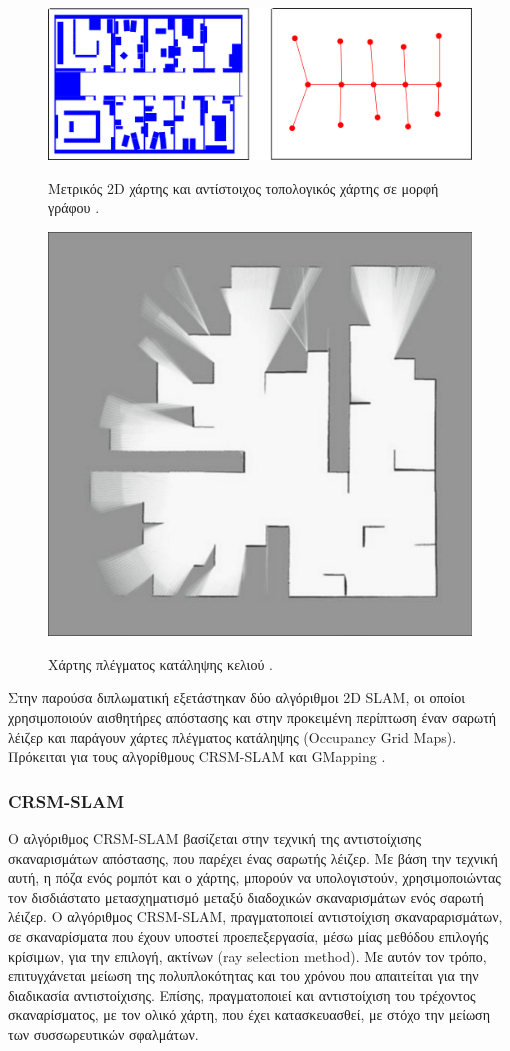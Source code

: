 \begin{figure}[!ht]
	\centering
	\includegraphics[width=0.7\linewidth]{Chapters/Chapter3/Figures/ogm_and_tm.png}
	\label{fig:ogm_and_tm}
	\caption[Μετρικός 2D χάρτης και αντίστοιχος τοπολογικός χάρτης σε μορφή γράφου.]{Μετρικός 2D χάρτης και αντίστοιχος τοπολογικός χάρτης σε μορφή γράφου \cite{probabilistic_robotics}.}
\end{figure}

\begin{figure}[!ht]
	\centering
	\includegraphics[width=0.4\linewidth]{Chapters/Chapter3/Figures/ogm.jpg}
	\label{fig:ogm}
	\caption[Χάρτης πλέγματος κατάληψης κελιού.]{Χάρτης πλέγματος κατάληψης κελιού \cite{crsm}.}
\end{figure}

\bigskip
Στην παρούσα διπλωματική εξετάστηκαν δύο αλγόριθμοι 2D SLAM, οι οποίοι χρησιμοποιούν αισθητήρες απόστασης και στην προκειμένη περίπτωση έναν {σαρωτή λέιζερ} και παράγουν χάρτες πλέγματος κατάληψης (Occupancy Grid Maps). Πρόκειται για τους αλγορίθμους CRSM-SLAM \cite{crsm} και GMapping \cite{gmapping}.

\bigskip
\subsubsection{CRSM-SLAM} \label{sssec:crsm_slam}
Ο αλγόριθμος CRSM-SLAM βασίζεται στην τεχνική της αντιστοίχισης σκαναρισμάτων απόστασης, που παρέχει ένας {σαρωτής λέιζερ}. Με βάση την τεχνική αυτή, η πόζα ενός ρομπότ και ο χάρτης, μπορούν να υπολογιστούν, χρησιμοποιώντας τον δισδιάστατο μετασχηματισμό μεταξύ διαδοχικών σκαναρισμάτων ενός σαρωτή λέιζερ. Ο αλγόριθμος CRSM-SLAM, πραγματοποιεί αντιστοίχιση σκαναραρισμάτων, σε σκαναρίσματα που έχουν υποστεί προεπεξεργασία, μέσω μίας μεθόδου επιλογής κρίσιμων, για την επιλογή, ακτίνων (ray selection method). Με αυτόν τον τρόπο, επιτυγχάνεται μείωση της πολυπλοκότητας και του χρόνου που απαιτείται για την διαδικασία αντιστοίχισης. Επίσης, πραγματοποιεί και αντιστοίχιση του τρέχοντος σκαναρίσματος, με τον ολικό χάρτη, που έχει κατασκευασθεί, με στόχο την μείωση των συσσωρευτικών σφαλμάτων.

